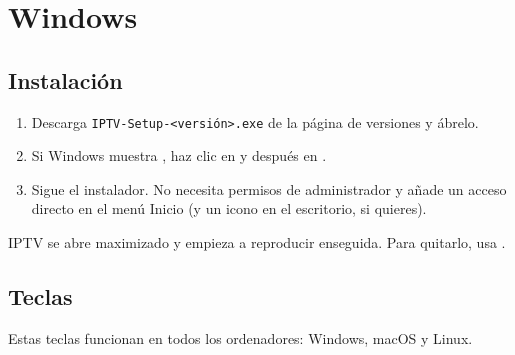 
\section{Windows}
\label{sec:windows}

\subsection{Instalación}
\begin{enumerate}
  \item Descarga \texttt{IPTV-Setup-\textless versión\textgreater.exe} de la
        página de versiones y ábrelo.
  \item Si Windows muestra , haz clic en
         y después en .
  \item Sigue el instalador. No necesita permisos de administrador y añade
        un acceso directo en el menú Inicio (y un icono en el escritorio, si
        quieres).
\end{enumerate}
IPTV se abre maximizado y empieza a reproducir enseguida. Para quitarlo, usa
.

\subsection{Teclas}
\label{sec:keys}
Estas teclas funcionan en todos los ordenadores: Windows, macOS y Linux.

